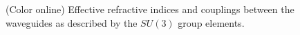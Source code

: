 \documentclass[9pt,twocolumn,twoside]{osajnl}
\begin{document}
\begin{figure}[htbp]
\centering
{}
\caption{(Color online) Effective refractive indices and couplings between the waveguides as described by the $SU(3)$ group elements.}
\label{fig:Fig2}
\end{figure}
\end{document}
